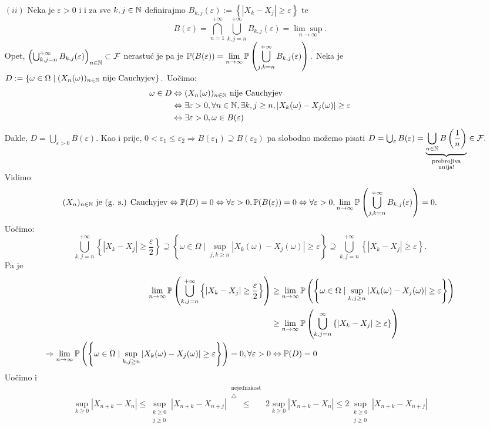 \documentclass{article}
\newcommand{\mylimsup}{\underset{n\to\infty}{\lim\sup}}
\begin{document}
\begin{itemize}
    \item[\((ii)\)] Neka je \(\varepsilon>0\) i i za sve \(k,j\in\Bbb N\) definirajmo \(B_{k,j}(\varepsilon):=\left\{|X_k-X_j|\ge\varepsilon\right\}\) te \[B(\varepsilon)=\bigcap_{n=1}^{+\infty}\bigcup_{k,j=n}^{+\infty}B_{k,j}(\varepsilon)=\mylimsup .\] Opet, \(\left(\bigcup_{k,j=n}^{+\infty}B_{k,j}(\varepsilon)\right)_{n\in\Bbb N}\subset\mathcal F\) nerastuć je pa je \(\displaystyle\Bbb P(B(\varepsilon))=\lim_{n\to\infty}\Bbb P\left(\bigcup_{j,k=n}^{+\infty}B_{k,j}(\varepsilon)\right).\) Neka je \(D:=\left\{\omega\in\Omega\mid (X_n(\omega))_{n\in\Bbb N}\text{ nije Cauchyjev}\right\}.\)  Uočimo: \[\begin{aligned}\omega\in D&\Leftrightarrow (X_n(\omega))_{n\in\Bbb N}\text{ nije Cauchyjev}\\&\Leftrightarrow\exists\varepsilon >0,\forall n\in\Bbb N,\exists k,j\ge n,|X_k(\omega)-X_j(\omega)|\ge\varepsilon\\&\Leftrightarrow\exists\varepsilon>0,\omega\in B(\varepsilon)\end{aligned}\] Dakle, \(D=\bigcup_{\varepsilon>0}B(\varepsilon).\) Kao i prije, \(0<\varepsilon_1\le\varepsilon_2\Rightarrow B(\varepsilon_1)\supseteq B(\varepsilon_2)\) pa slobodno možemo pisati \(D=\bigcup_{\varepsilon}B(\varepsilon)=\underbrace{\bigcup_{n\in\Bbb N}B\left(\frac1n\right)}_{\substack{\text{prebrojiva}\\\text{unija!}}}\in\mathcal F.\) Vidimo \[(X_n)_{n\in\Bbb N}\text{ je (g. s.) Cauchyjev}\Leftrightarrow\Bbb P(D)=0\Leftrightarrow\forall\varepsilon >0, \Bbb P(B(\varepsilon))=0\Leftrightarrow \forall\varepsilon>0,\lim\limits_{n\to\infty}\Bbb P\left(\bigcup_{j,k=n}^{+\infty}B_{k,j}(\varepsilon)\right)=0.\] Uočimo: \[\bigcup_{k,j=n}^{+\infty}\left\{|X_k-X_j|\ge\frac\varepsilon2\right\}\supseteq\left\{\omega\in\Omega\mid \sup_{j,k\ge n}|X_k(\omega)-X_j(\omega)|\ge\varepsilon\right\}\supseteq\bigcup_{k,j=n}^{+\infty}\left\{|X_k-X_j|\ge\varepsilon\right\}.\] Pa je \[\begin{aligned}\lim_{n\to\infty}\Bbb P\left(\bigcup_{k,j=n}^{+\infty}\left\{|X_k-X_j|\ge\frac\varepsilon2\right\}\right)&\ge\lim_{n\to\infty}\Bbb P\left(\left\{\omega\in\Omega\mid\sup_{k,j\ge n}|X_k(\omega)-X_j(\omega)|\ge\varepsilon\right\}\right)\\&\ge \lim_{n\to\infty}\Bbb P\left(\bigcup_{k,j=n}^{\infty}\left\{|X_k-X_j|\ge\varepsilon\right\}\right)\\\Rightarrow \lim_{n\to\infty}\Bbb P\left(\left\{\omega\in\Omega\mid\sup_{k,j\ge n}|X_k(\omega)-X_j(\omega)|\ge\varepsilon\right\}\right)=0,\forall\varepsilon>0&\Leftrightarrow\Bbb P(D)=0\end{aligned}\] Uočimo i \[\sup_{k\ge 0}|X_{n+k}-X_n|\le\sup_{\substack{k\ge0\\j\ge 0}}|X_{n+k}-X_{n+j}|\overset{\substack{\text{nejednakost}\\\triangle}}{\le}2\sup_{k\ge 0}|X_{n+k}-X_n|\le2\sup_{\substack{k\ge0\\j\ge0}}|X_{n+k}-X_{n+j}|\] 
\end{itemize}
\end{document}
